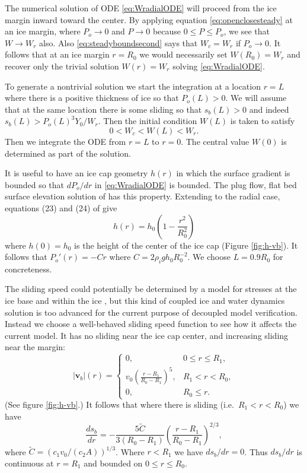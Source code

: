 \documentclass[11pt,final]{amsart}%
\newcommand\bv{\mathbf{v}}
\begin{document}
The numerical solution of ODE \eqref{eq:WradialODE} will proceed from the ice margin inward toward the center.  By applying equation \eqref{eq:openclosesteady} at an ice margin, where $P_o\to 0$ and $P\to 0$ because $0 \le P \le P_o$, we see that $W \to W_r$ also.  Also \eqref{eq:steadyboundsecond} says that $W_c = W_r$ if $P_o\to 0$.  It follows that at an ice margin $r=R_0$ we would necessarily set $W(R_0)=W_r$ and recover only the trivial solution $W(r)=W_r$ solving \eqref{eq:WradialODE}.

To generate a nontrivial solution we start the integration at a location $r=L$ where there is a positive thickness of ice so that $P_o(L)>0$.  We will assume that at the same location there is some sliding so that $s_b(L)>0$ and indeed $s_b(L) > P_o(L)^3 Y_0 / W_r$.  Then the initial condition $W(L)$ is taken to satisfy
	$$0 < W_c < W(L) < W_r.$$
Then we integrate the ODE from $r=L$ to $r=0$.  The central value $W(0)$ is determined as part of the solution.

It is useful to have an ice cap geometry $h(r)$ in which the surface gradient is bounded so that $dP_o/dr$ in \eqref{eq:WradialODE} is bounded.  The plug flow, flat bed surface elevation solution of \cite{Bodvardsson} has this property.  Extending to the radial case, equations (23) and (24) of \citep{Bodvardsson} give
\begin{equation}
h(r) = h_0 \left(1 - \frac{r^2}{R_0^2} \right) \label{eq:choosebodvardssonh}
\end{equation}
where $h(0)=h_0$ is the height of the center of the ice cap (Figure \ref{fig:h-vb}).  It follows that $P_o'(r) = - C r$ where $C=2\rho_i g h_0 R_0^{-2}$.  We choose $L=0.9 R_0$ for concreteness.

The sliding speed could potentially be determined by a model for stresses at the ice base and within the ice \citep{Bodvardsson,GreveBlatter2009}, but this kind of coupled ice and water dynamics solution is too advanced for the current purpose of decoupled model verification.  Instead we choose a well-behaved sliding speed function to see how it affects the current model.  It has no sliding near the ice cap center, and increasing sliding near the margin:
\begin{equation}
|\bv_b|(r) = \begin{cases} 0, & 0 \le r \le R_1, \\
                           v_0  \left(\frac{r-R_1}{R_0-R_1}\right)^5, & R_1 < r < R_0, \\
                           0, & R_0 \le r.
             \end{cases}  \label{eq:choosevb}
\end{equation}
(See figure \ref{fig:h-vb}.)  It follows that where there is sliding (i.e.~$R_1 < r < R_0$) we have
\begin{equation}
\frac{ds_b}{dr} = - \frac{5 \tilde C}{3 (R_0-R_1)} \left(\frac{r-R_1}{R_0-R_1}\right)^{2/3}, \label{eq:determinessbprime}
\end{equation}
where $\tilde C = (c_1 v_0/(c_2 A))^{1/3}$.  Where $r<R_1$ we have $ds_b/dr = 0$.  Thus $ds_b/dr$ is continuous at $r=R_1$ and bounded on $0\le r \le R_0$.
\end{document}

